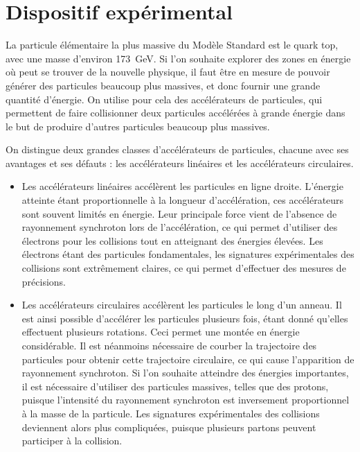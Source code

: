 \chapter{Dispositif expérimental} \label{chap:detecteur}


La particule élémentaire la plus massive du Modèle Standard est le quark top, avec une masse d'environ \SI{173}{\GeV}. Si l'on souhaite explorer des zones en énergie où peut se trouver de la nouvelle physique, il faut être en mesure de pouvoir générer des particules beaucoup plus massives, et donc fournir une grande quantité d'énergie. On utilise pour cela des accélérateurs de particules, qui permettent de faire collisionner deux particules accélérées à grande énergie dans le but de produire d'autres particules beaucoup plus massives.

On distingue deux grandes classes d'accélérateurs de particules, chacune avec ses avantages et ses défauts : les accélérateurs linéaires et les accélérateurs circulaires.

\begin{itemize}
  \item Les accélérateurs linéaires accélèrent les particules en ligne droite. L'énergie atteinte étant proportionnelle à la longueur d'accélération, ces accélérateurs sont souvent limités en énergie. Leur principale force vient de l'absence de rayonnement synchroton lors de l'accélération, ce qui permet d'utiliser des électrons pour les collisions tout en atteignant des énergies élevées. Les électrons étant des particules fondamentales, les signatures expérimentales des collisions sont extrêmement claires, ce qui permet d'effectuer des mesures de précisions.
  \item Les accélérateurs circulaires accélèrent les particules le long d'un anneau. Il est ainsi possible d'accélérer les particules plusieurs fois, étant donné qu'elles effectuent plusieurs rotations. Ceci permet une montée en énergie considérable. Il est néanmoins nécessaire de courber la trajectoire des particules pour obtenir cette trajectoire circulaire, ce qui cause l'apparition de rayonnement synchroton. Si l'on souhaite atteindre des énergies importantes, il est nécessaire d'utiliser des particules massives, telles que des protons, puisque l'intensité du rayonnement synchroton est inversement proportionnel à la masse de la particule. Les signatures expérimentales des collisions deviennent alors plus compliquées, puisque plusieurs partons peuvent participer à la collision.
\end{itemize}

